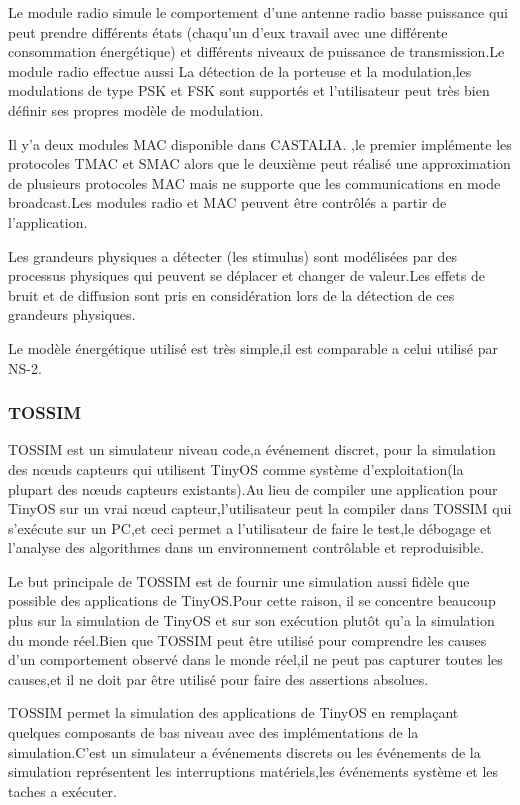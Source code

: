 Le module radio simule le comportement d'une antenne radio basse puissance qui peut prendre différents états (chaqu'un d'eux travail avec une différente consommation énergétique) et différents niveaux de puissance de transmission.Le module radio effectue aussi La détection de la porteuse et la modulation,les modulations de type PSK et FSK sont supportés et l'utilisateur peut très bien définir ses propres modèle de modulation.

Il y'a deux modules MAC disponible dans CASTALIA.
,le premier implémente les protocoles TMAC et SMAC alors que le deuxième peut réalisé une approximation de plusieurs protocoles MAC mais ne supporte que les communications en mode broadcast.Les modules radio et MAC peuvent être contrôlés a partir de l'application.

Les grandeurs physiques a détecter (les stimulus) sont modélisées par des processus physiques qui peuvent se déplacer et changer de valeur.Les effets de  bruit et de  diffusion sont pris en considération lors de la détection de ces grandeurs physiques.

Le modèle énergétique utilisé est très simple,il est comparable a celui utilisé par NS-2.

\subsubsection{TOSSIM}
TOSSIM est un simulateur niveau code,a événement discret, pour la simulation des nœuds capteurs qui utilisent TinyOS comme système d'exploitation(la plupart des nœuds capteurs existants).Au lieu de compiler une application pour TinyOS sur un vrai nœud capteur,l'utilisateur peut la compiler dans TOSSIM qui s'exécute sur un PC,et ceci permet a l'utilisateur de faire le test,le débogage et l'analyse des algorithmes dans un environnement contrôlable et reproduisible.

Le but principale de TOSSIM est de fournir une simulation aussi fidèle que possible des applications de TinyOS.Pour cette raison, il se concentre beaucoup plus sur la simulation de TinyOS et sur son exécution plutôt qu'a la simulation du monde réel.Bien que TOSSIM peut être utilisé pour comprendre les causes d'un comportement observé dans le monde réel,il ne peut pas capturer toutes les causes,et il ne doit par être utilisé pour faire des assertions absolues.

TOSSIM permet la simulation des applications de TinyOS en remplaçant quelques composants de bas niveau avec des implémentations de la simulation.C'est un simulateur a événements discrets ou les événements de la simulation représentent les interruptions matériels,les événements système et les taches a exécuter.

